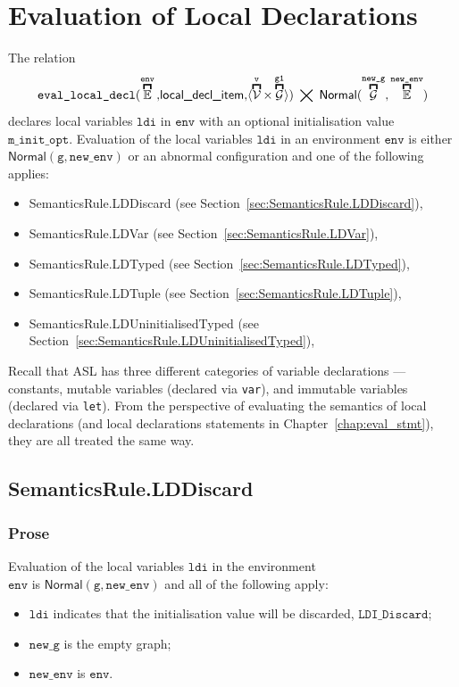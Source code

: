 \documentclass{book}
\newcommand\secref[1]{Section~\ref{sec:#1}}
\newcommand\chapref[1]{Chapter~\ref{chap:#1}}
\newcommand\overname[2]{\overbracket{#1}^{#2}}
\newcommand\XGraphs[0]{\mathcal{G}}
\newcommand\vals[0]{\mathcal{V}}
\newcommand\aslrel[0]{\bigtimes}
\newcommand\aslsep[0]{\mathbf{,}}
\newcommand\evallocaldecl[1]{\texttt{eval\_local\_decl}(#1)}
\newcommand\Normal[0]{\textsf{Normal}}
\newcommand\newenv[0]{\texttt{new\_env}}
\newcommand\env[0]{\texttt{env}}
\newcommand\vg[0]{\texttt{g}}
\newcommand\newg[0]{\texttt{new\_g}}
\newcommand\vv[0]{\texttt{v}}
\newcommand\vgone[0]{\texttt{g1}}
\newcommand\ldi[0]{\texttt{ldi}}
\newcommand\minitopt[0]{\texttt{m\_init\_opt}}
\begin{document}

\chapter{Evaluation of Local Declarations \label{chap:eval_local_decl}}

The relation
\[
  \evallocaldecl{\overname{\envs}{\env} \aslsep \localdeclitem \aslsep \langle\overname{\vals}{\vv}\times\overname{\XGraphs}{\vgone}\rangle} \;\aslrel\;
                         \Normal(\overname{\XGraphs}{\newg}, \overname{\envs}{\newenv})
\]
declares local variables
$\ldi$ in $\env$ with an optional initialisation value
$\minitopt$.  Evaluation of the local variables $\ldi$
in an environment $\env$ is either $\Normal(\vg, \newenv)$
or an abnormal configuration and one of the following applies:
\begin{itemize}
  \item SemanticsRule.LDDiscard (see \secref{SemanticsRule.LDDiscard}),
  \item SemanticsRule.LDVar (see \secref{SemanticsRule.LDVar}),
  \item SemanticsRule.LDTyped (see \secref{SemanticsRule.LDTyped}),
  \item SemanticsRule.LDTuple (see \secref{SemanticsRule.LDTuple}),
  \item SemanticsRule.LDUninitialisedTyped (see \secref{SemanticsRule.LDUninitialisedTyped}),
\end{itemize}

Recall that ASL has three different categories of variable declarations ---
constants, mutable variables (declared via \texttt{var}), and immutable variables (declared via \texttt{let}).
From the perspective of evaluating the semantics of local declarations (and local declarations statements
in \chapref{eval_stmt}), they are all treated the same way.

\section{SemanticsRule.LDDiscard \label{sec:SemanticsRule.LDDiscard}}
    \subsection{Prose}
    Evaluation of the local variables $\ldi$ in the environment \\
    $\env$ is $\Normal(\vg, \newenv)$ and all of the following apply:
    \begin{itemize}
    \item $\ldi$ indicates that the initialisation value will be discarded,
    $\texttt{LDI\_Discard}$;
    \item $\newg$ is the empty graph;
    \item $\newenv$ is $\env$.
    \end{itemize}
\end{document}
